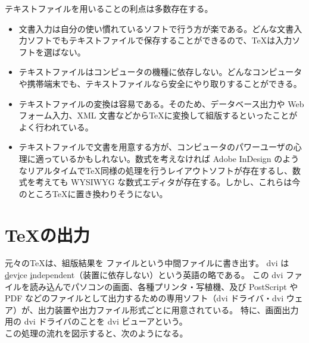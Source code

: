 テキストファイルを用いることの利点は多数存在する。
\begin{itemize}\setlength{\leftskip}{-1.00zw}%
\item 文書入力は自分の使い慣れているソフトで行う方が楽である。どんな文書入力ソフトでもテキストファイルで保存することができるので、\TeX{}は入力ソフトを選ばない。
\item テキストファイルはコンピュータの機種に依存しない。どんなコンピュータや携帯端末でも、テキストファイルなら安全にやり取りすることができる。
\item テキストファイルの変換は容易である。そのため、データベース出力や Web フォーム入力、XML 文書などから\TeX{}に変換して組版するといったことがよく行われている。
\item テキストファイルで文書を用意する方が、コンピュータのパワーユーザの心理に適っているかもしれない。数式を考えなければ Adobe InDesign のようなリアルタイムで\TeX{}同様の処理を行うレイアウトソフトが存在するし、数式を考えても WYSIWYG な数式エディタが存在する。しかし、これらは今のところ\TeX{}に置き換わりそうにない。
\end{itemize}
\section{\TeX{}の出力}
元々の\TeX{}は、組版結果を  ファイルという中間ファイルに書き出す。
dvi は \underline{d}ev\underline{i}ce \underline{i}ndependent（装置に依存しない）という英語の略である。
この dvi ファイルを読み込んでパソコンの画面、各種プリンタ・写植機、及び PostScript や PDF などのファイルとして出力するための専用ソフト（dvi ドライバ・dvi ウェア）が、出力装置や出力ファイル形式ごとに用意されている。
特に、画面出力用の dvi ドライバのことを dvi ビューアという。\\

この処理の流れを図示すると、次のようになる。

\vspc{-5.00pt}\begin{figure}[H]\centering{}\end{figure}\vspc{-5.00pt}

